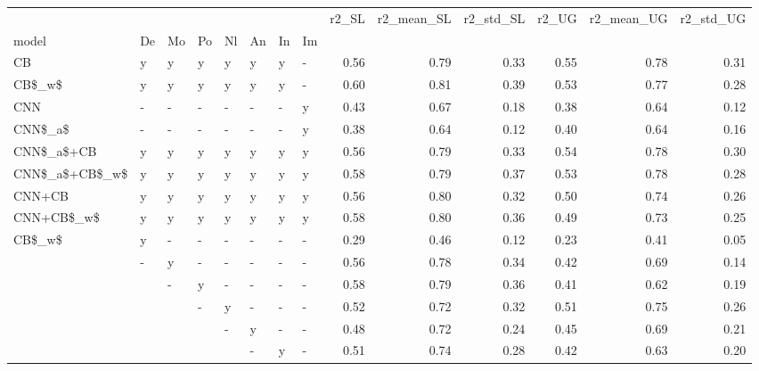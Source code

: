 \begin{tabular}{llllllllrrrrrr}
\toprule
       &   &   &   &   &   &   &   &  r2\_SL &  r2\_mean\_SL &  r2\_std\_SL &  r2\_UG &  r2\_mean\_UG &  r2\_std\_UG \\
model & De & Mo & Po & Nl & An & In & Im &        &             &            &        &             &            \\
\midrule
CB & y & y & y & y & y & y & - &   0.56 &        0.79 &       0.33 &   0.55 &        0.78 &       0.31 \\
CB\$\_w\$ & y & y & y & y & y & y & - &   0.60 &        0.81 &       0.39 &   0.53 &        0.77 &       0.28 \\
CNN & - & - & - & - & - & - & y &   0.43 &        0.67 &       0.18 &   0.38 &        0.64 &       0.12 \\
CNN\$\_a\$ & - & - & - & - & - & - & y &   0.38 &        0.64 &       0.12 &   0.40 &        0.64 &       0.16 \\
CNN\$\_a\$+CB & y & y & y & y & y & y & y &   0.56 &        0.79 &       0.33 &   0.54 &        0.78 &       0.30 \\
CNN\$\_a\$+CB\$\_w\$ & y & y & y & y & y & y & y &   0.58 &        0.79 &       0.37 &   0.53 &        0.78 &       0.28 \\
CNN+CB & y & y & y & y & y & y & y &   0.56 &        0.80 &       0.32 &   0.50 &        0.74 &       0.26 \\
CNN+CB\$\_w\$ & y & y & y & y & y & y & y &   0.58 &        0.80 &       0.36 &   0.49 &        0.73 &       0.25 \\
CB\$\_w\$ & y & - & - & - & - & - & - &   0.29 &        0.46 &       0.12 &   0.23 &        0.41 &       0.05 \\
       & - & y & - & - & - & - & - &   0.56 &        0.78 &       0.34 &   0.42 &        0.69 &       0.14 \\
       &   & - & y & - & - & - & - &   0.58 &        0.79 &       0.36 &   0.41 &        0.62 &       0.19 \\
       &   &   & - & y & - & - & - &   0.52 &        0.72 &       0.32 &   0.51 &        0.75 &       0.26 \\
       &   &   &   & - & y & - & - &   0.48 &        0.72 &       0.24 &   0.45 &        0.69 &       0.21 \\
       &   &   &   &   & - & y & - &   0.51 &        0.74 &       0.28 &   0.42 &        0.63 &       0.20 \\
\bottomrule
\end{tabular}
